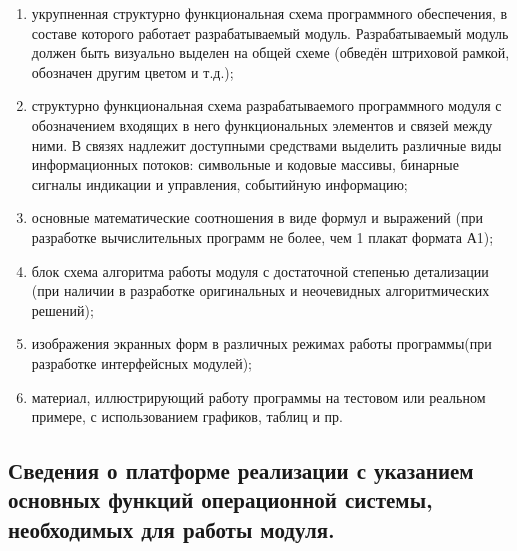 \begin{enumerate}
\item  укрупненная структурно функциональная схема программного обеспечения, в составе которого работает разрабатываемый модуль. Разрабатываемый модуль должен быть визуально выделен на общей схеме (обведён штриховой рамкой, обозначен другим цветом и т.д.);
\item  структурно функциональная схема разрабатываемого программного модуля с обозначением входящих в него функциональных элементов и связей между ними. В связях надлежит доступными средствами выделить различные виды информационных потоков: символьные и кодовые массивы, бинарные сигналы индикации и управления, событийную информацию;
\item  основные математические соотношения в виде формул и выражений (при разработке вычислительных программ не более, чем 1 плакат формата А1);
\item  блок схема алгоритма работы модуля с достаточной степенью детализации (при наличии в разработке оригинальных и неочевидных алгоритмических решений);
\item  изображения экранных форм в различных режимах работы программы(при разработке интерфейсных модулей);
\item  материал, иллюстрирующий работу программы на тестовом или реальном примере, с использованием графиков, таблиц и пр.
\end{enumerate}

\subsection{Сведения о платформе реализации с указанием основных функций операционной системы, необходимых для работы модуля.}
